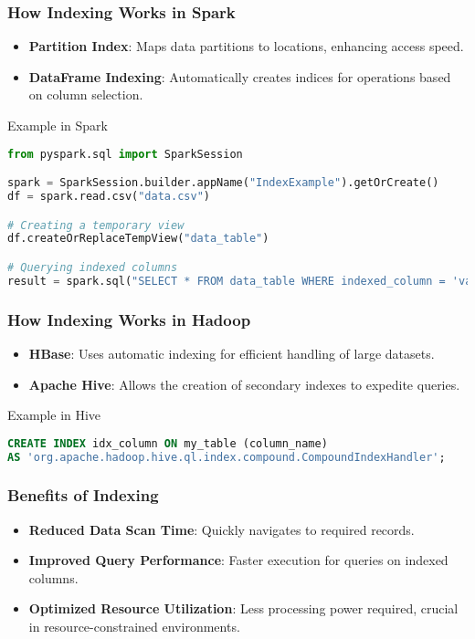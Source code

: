 \documentclass{beamer}
\begin{document}
\begin{frame}[fragile]
    \frametitle{How Indexing Works in Spark}
    \begin{itemize}
        \item \textbf{Partition Index}: Maps data partitions to locations, enhancing access speed.
        \item \textbf{DataFrame Indexing}: Automatically creates indices for operations based on column selection.
    \end{itemize}

    \begin{block}{Example in Spark}
        \begin{lstlisting}[language=Python]
from pyspark.sql import SparkSession

spark = SparkSession.builder.appName("IndexExample").getOrCreate()
df = spark.read.csv("data.csv")

# Creating a temporary view
df.createOrReplaceTempView("data_table")

# Querying indexed columns
result = spark.sql("SELECT * FROM data_table WHERE indexed_column = 'value'")
        \end{lstlisting}
    \end{block}
\end{frame}

\begin{frame}[fragile]
    \frametitle{How Indexing Works in Hadoop}
    \begin{itemize}
        \item \textbf{HBase}: Uses automatic indexing for efficient handling of large datasets.
        \item \textbf{Apache Hive}: Allows the creation of secondary indexes to expedite queries.
    \end{itemize}

    \begin{block}{Example in Hive}
        \begin{lstlisting}[language=SQL]
CREATE INDEX idx_column ON my_table (column_name) 
AS 'org.apache.hadoop.hive.ql.index.compound.CompoundIndexHandler';
        \end{lstlisting}
    \end{block}
\end{frame}

\begin{frame}[fragile]
    \frametitle{Benefits of Indexing}
    \begin{itemize}
        \item \textbf{Reduced Data Scan Time}: Quickly navigates to required records.
        \item \textbf{Improved Query Performance}: Faster execution for queries on indexed columns.
        \item \textbf{Optimized Resource Utilization}: Less processing power required, crucial in resource-constrained environments.
    \end{itemize}
\end{frame}
\end{document}
